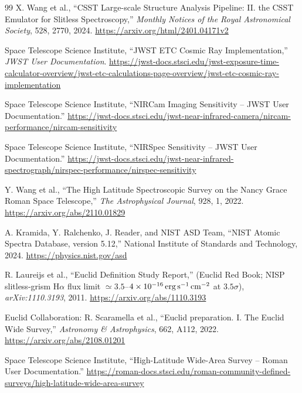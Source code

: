 \clearpage
\begin{thebibliography}{99}
X. Wang et al.,
``CSST Large-scale Structure Analysis Pipeline: II. the CSST Emulator for Slitless Spectroscopy,''
\emph{Monthly Notices of the Royal Astronomical Society}, 528, 2770, 2024.
\url{https://arxiv.org/html/2401.04171v2}

Space Telescope Science Institute,
``JWST ETC Cosmic Ray Implementation,''
\emph{JWST User Documentation}.
\url{https://jwst-docs.stsci.edu/jwst-exposure-time-calculator-overview/jwst-etc-calculations-page-overview/jwst-etc-cosmic-ray-implementation}

Space Telescope Science Institute,
``NIRCam Imaging Sensitivity -- JWST User Documentation.''
\url{https://jwst-docs.stsci.edu/jwst-near-infrared-camera/nircam-performance/nircam-sensitivity}

Space Telescope Science Institute,
``NIRSpec Sensitivity -- JWST User Documentation.''
\url{https://jwst-docs.stsci.edu/jwst-near-infrared-spectrograph/nirspec-performance/nirspec-sensitivity}

Y. Wang et al.,
``The High Latitude Spectroscopic Survey on the Nancy Grace Roman Space Telescope,''
\emph{The Astrophysical Journal}, 928, 1, 2022.
\url{https://arxiv.org/abs/2110.01829}

A. Kramida, Y. Ralchenko, J. Reader, and NIST ASD Team,
``NIST Atomic Spectra Database, version 5.12,''
National Institute of Standards and Technology, 2024.
\url{https://physics.nist.gov/asd}

R. Laureijs et al.,
``Euclid Definition Study Report,'' (Euclid Red Book; NISP slitless-grism H$\alpha$ flux limit $\simeq3.5$--$4\times10^{-16}\,{\rm erg\,s^{-1}\,cm^{-2}}$ at $3.5\sigma$),
\emph{arXiv:1110.3193}, 2011.
\url{https://arxiv.org/abs/1110.3193}

Euclid Collaboration: R. Scaramella et al.,
``Euclid preparation. I. The Euclid Wide Survey,''
\emph{Astronomy \& Astrophysics}, 662, A112, 2022.
\url{https://arxiv.org/abs/2108.01201}

Space Telescope Science Institute,
``High-Latitude Wide-Area Survey -- Roman User Documentation.''
\url{https://roman-docs.stsci.edu/roman-community-defined-surveys/high-latitude-wide-area-survey}


\end{thebibliography}
